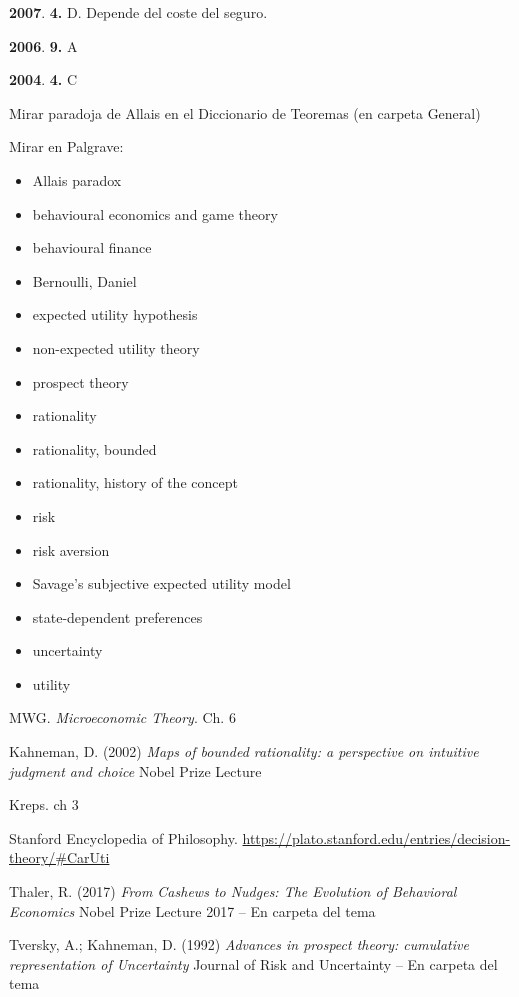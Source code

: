 \documentclass{nuevotema}
\begin{document}
\textbf{2007}. \textbf{4.} D. Depende del coste del seguro.

\textbf{2006}. \textbf{9.} A

\textbf{2004}. \textbf{4.} C

Mirar paradoja de Allais en el Diccionario de Teoremas (en carpeta General)


\bibliografia

Mirar en Palgrave:
\begin{itemize}
    \item Allais paradox
    \item behavioural economics and game theory
    \item behavioural finance
    \item Bernoulli, Daniel
    \item expected utility hypothesis
    \item non-expected utility theory
    \item prospect theory
    \item rationality
    \item rationality, bounded
    \item rationality, history of the concept
    \item risk
    \item risk aversion 
    \item Savage's subjective expected utility model
    \item state-dependent preferences
    \item uncertainty
    \item utility
\end{itemize}

MWG. \textit{Microeconomic Theory}. Ch. 6

Kahneman, D. (2002) \textit{Maps of bounded rationality: a perspective on intuitive judgment and choice} Nobel Prize Lecture

Kreps. ch 3

Stanford Encyclopedia of Philosophy. \url{https://plato.stanford.edu/entries/decision-theory/\#CarUti}

Thaler, R. (2017) \textit{From Cashews to Nudges: The Evolution of Behavioral Economics} Nobel Prize Lecture 2017 -- En carpeta del tema

Tversky, A.; Kahneman, D. (1992) \textit{Advances in prospect theory: cumulative representation of Uncertainty} Journal of Risk and Uncertainty -- En carpeta del tema
\end{document}
